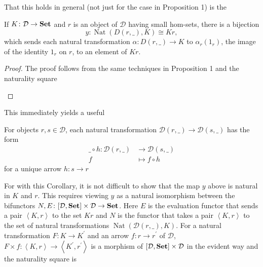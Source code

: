 \documentclass[10pt]{amsart}
\begin{document}
  That this holds in general (not just for the case in Proposition 1) is the
  \begin{lem}[Yoneda]
    If $K \colon \mathcal{D} \rightarrow {\bf Set}$ and $r$ is an object of $\mathcal{D}$ having small hom-sets, there is a bijection
    $$y \colon \operatorname{Nat}(D(r, \_), K) \cong Kr,$$
    which sends each natural transformation $\alpha \colon D(r, \_) \rightarrow K$ to $\alpha_r(1_r)$, the image of the identity $1_r$ on $r$, to an element of $Kr$.
    \begin{proof}
      The proof follows from the same techniques in Proposition 1 and the naturality square
      \begin{center}
      \end{center}
    \end{proof}
  \end{lem}
  This immediately yields a useful
  \begin{cor}
    For objects $r, s \in \mathcal{D}$, each natural transformation $\mathcal{D}(r, \_) \rightarrow \mathcal{D}(s, \_)$ has the form
    \begin{align*}
      \_ \circ h \colon \mathcal{D}(r, \_) &\rightarrow \mathcal{D}(s, \_)\\
      f & \mapsto f \circ h 
    \end{align*}
    for a unique arrow $h \colon s \rightarrow r$
  \end{cor}
  For with this Corollary, it is not difficult to show that the map $y$ above is natural in $K$ and $r$.
  This requires viewing $y$ as a natural isomorphism between the bifunctors $N, E \colon [\mathcal{D}, {\bf Set}] \times \mathcal{D} \rightarrow {\bf Set}$.
  Here $E$ is the evaluation functor that sends a pair $\left<K, r\right>$ to the set $Kr$ and $N$ is the functor that takes a pair $\left<K, r\right>$ to the set of natural transformations $\operatorname{Nat}(\mathcal{D}(r, \_), K)$.
  For a natural transformation $F \colon K \rightarrow K^\prime$ and an arrow $f \colon r \rightarrow r^\prime$ of $\mathcal{D}$, $F \times f \colon \left<K, r\right> \rightarrow \left<K^\prime, r^\prime\right>$ is a morphism of $[\mathcal{D}, {\bf Set}] \times \mathcal{D}$ in the evident way and the naturality square is
  \begin{center}
  \end{center}
  
\end{document}
